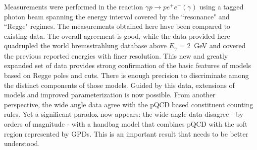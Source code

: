 \documentclass[aps,prc,twocolumn,floatfix,showpacs,preprintnumbers,amsmath,amssymb,superscriptaddress,linenumbers]{revtex4-1}
\begin{document}
Measurements were 
performed in the reaction $\gamma p\rightarrow pe^+e^-(\gamma)$ 
using a tagged photon beam spanning the energy interval covered 
by the ``resonance" and ``Regge" regimes.
The measurements obtained here have been compared to existing 
data. The overall agreement is good, while the data provided 
here quadrupled the world bremsstrahlung database above $E_{\gamma}$ = 
2~GeV and covered the previous reported energies with finer 
resolution. This new and greatly expanded set of data provides strong confirmation of the basic features of models based on Regge poles and cuts. There is enough precision to discriminate among the distinct components of those models. Guided by this data, extensions of models and improved parameterization is now possible. From another perspective, the wide angle data agree with the pQCD based constituent counting rules. Yet a significant paradox now appears: the wide angle data disagree - by orders of magnitude - with a handbag model that combines pQCD with the soft region represented by GPDs. This is an important result that needs to be better understood.

  
\end{document}
